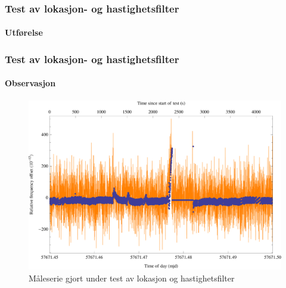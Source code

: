 \documentclass[xcolor=table]{beamer}
\begin{document}
\begin{frame}
\frametitle{Test av lokasjon- og hastighetsfilter}
\framesubtitle{Utførelse}
\begin{center}
\end{center}
\end{frame}

\begin{frame}
\frametitle{Test av lokasjon- og hastighetsfilter}
\framesubtitle{Observasjon}
      \begin{figure}
        \includegraphics[scale=0.70]{thesis/graphics/cns91-and-csac-telemetry-frequency-1.png}
        \caption{Måleserie gjort under test av lokasjon og hastighetsfilter}
      \end{figure}
\end{frame}
\end{document}
